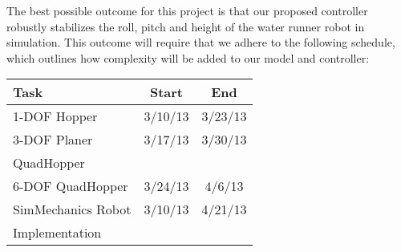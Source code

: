 The best possible outcome for this project is that our proposed controller robustly stabilizes the roll, pitch and height of the water runner robot in simulation. This outcome will require that we adhere to the following schedule, which outlines how complexity will be added to our model and controller:

\begin{table}[htb]
\centering
	\begin{tabular}{lcc}
		\textbf{Task} & \textbf{Start} & \textbf{End} \\ \hline
		1-DOF Hopper & 3/10/13 & 3/23/13 \\
		3-DOF Planer  & 3/17/13 & 3/30/13 \\
		\hspace{1EM} QuadHopper & & \\
		6-DOF QuadHopper & 3/24/13 & 4/6/13 \\
		SimMechanics Robot  & 3/10/13 & 4/21/13 \\
		\hspace{1EM} Implementation & & 
	\end{tabular}
\end{table}
